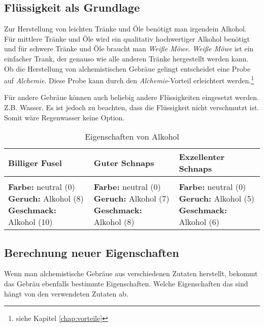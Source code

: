 \subsection{Flüssigkeit als Grundlage}
\label{chap:fluessigkeit_als_grundlage}
Zur Herstellung von leichten Tränke und Öle benötigt man irgendein Alkohol. Für mittlere Tränke und Öle wird ein qualitativ hochwertiger Alkohol benötigt und für schwere Tränke und Öle braucht man \textit{Weiße Möwe}. \textit{Weiße Möwe} ist ein einfacher Trank, der genauso wie alle anderen Tränke hergestellt werden kann. Ob die Herstellung von alchemistischen Gebräue gelingt entscheidet eine Probe auf \textit{Alchemie}. Diese Probe kann durch den \textit{Alchemie}-Vorteil erleichtert werden.\footnote{siehe Kapitel \ref{chap:vorteile}}

Für andere Gebräue können auch beliebig andere Flüssigkeiten eingesetzt werden. Z.B. Wasser. Es ist jedoch zu beachten, dass die Flüssigkeit nicht verschmutzt ist. Somit wäre Regenwasser keine Option. 

\begin{table}
\begin{center}
\begin{tabular}{p{}|p{}|p{}}
\textbf{Billiger Fusel} & \textbf{Guter Schnaps} & \textbf{Exzellenter Schnaps} \\ \hline
& & \\
\textbf{Farbe:} neutral (0) \newline
\textbf{Geruch:} Alkohol (8) \newline
\textbf{Geschmack:} Alkohol (10)
& 
\textbf{Farbe:} neutral (0) \newline
\textbf{Geruch:} Alkohol (7) \newline
\textbf{Geschmack:} Alkohol (8)
& 
\textbf{Farbe:} neutral (0) \newline
\textbf{Geruch:} Alkohol (5) \newline
\textbf{Geschmack:} Alkohol (6)
\end{tabular}
\end{center}
\caption{Eigenschaften von Alkohol}
\label{tab:eigenschaften_von_alkohol}
\end{table}

\subsection{Berechnung neuer Eigenschaften}
\label{chap:berechnung_neuer_eigenschaften}
Wenn man alchemistische Gebräue aus verschiedenen Zutaten herstellt, bekommt das Gebräu ebenfalls bestimmte Eigenschaften. Welche Eigenschaften das sind hängt von den verwendeten Zutaten ab. 

